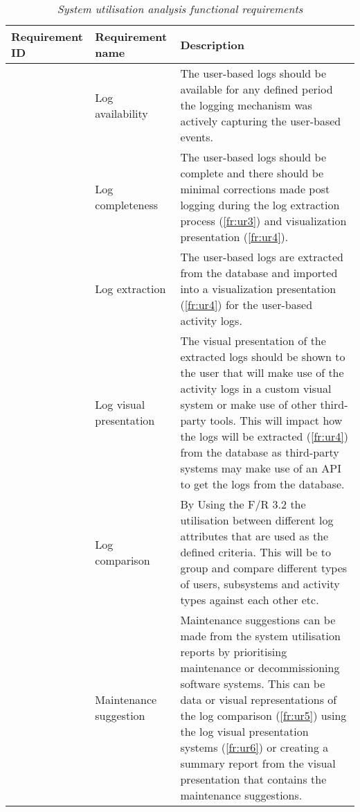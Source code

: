 \setcounter{phase}{3}
\setcounter{subphase}{0}
\begin{table}[!htb]
	\centering
	\small
	\caption[System utilisation analysis functional requirements]
	{\textit{System utilisation analysis functional requirements}}
	\label{tbl:ch2_utilisation_requirements}
	\begin{tabularx}{\textwidth}{|l|l|X|}
		\hline \textbf{Requirement ID} & \textbf{Requirement name} & \textbf{Description} \\
		\hline \subphase{fr:ur1} & Log availability & \RaggedRight The user-based logs should be available for any defined period the logging mechanism was actively capturing the user-based events. \\
		\hline \subphase{fr:ur2} & Log completeness & \RaggedRight The user-based logs should be complete and there should be minimal corrections made post logging during the log extraction process (\ref{fr:ur3}) and visualization presentation (\ref{fr:ur4}). \\
		\hline \subphase{fr:ur3} & Log extraction & \RaggedRight The user-based logs are extracted from the database and imported into a visualization presentation (\ref{fr:ur4}) for the user-based activity logs. \\
		\hline \subphase{fr:ur4} & Log visual presentation & The visual presentation of the extracted logs should be shown to the user that will make use of the activity logs in a custom visual system or make use of other third-party tools. This will impact how the logs will be extracted (\ref{fr:ur4}) from the database as third-party systems may make use of an API to get the logs from the database. \\
		\hline \subphase{fr:ur5} & Log comparison & \RaggedRight By Using the F/R 3.2 the utilisation between different log attributes that are used as the defined criteria. This will be to group and compare different types of users, subsystems and activity types against each other etc.\\
		\hline \subphase{fr:ur6} & \RaggedRight Maintenance suggestion & Maintenance suggestions can be made from the system utilisation reports by prioritising maintenance or decommissioning software systems. This can be data or visual representations of the log comparison (\ref{fr:ur5}) using the log visual presentation systems (\ref{fr:ur6}) or creating a summary report from the visual presentation that contains the maintenance suggestions. \\
		\hline
	\end{tabularx}
\end{table}

